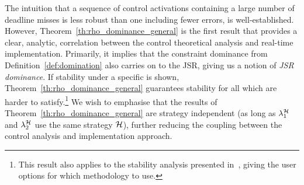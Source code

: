 The intuition that a sequence of control activations containing a large number of deadline misses is less robust than one including fewer errors, is well-established.
However, Theorem~\ref{th:rho_dominance_general} is the first result that provides a clear, analytic, correlation between the control theoretical analysis and real-time implementation.
Primarily, it implies that the constraint dominance from Definition~\ref{def:domination} also carries on to the JSR, giving us a notion of \emph{JSR dominance}.
If stability under a specific \ewhc{} is shown, Theorem~\ref{th:rho_dominance_general} guarantees stability for all \ewhc{} which are harder to satisfy.\footnote{This result also applies to the stability analysis presented in~\cite{Maggio:2020}, giving the user options for which methodology to use.}
We wish to emphasise that the results of Theorem~\ref{th:rho_dominance_general} are strategy independent (as long as $\lambda^{\mathcal{H}}_1$ and $\lambda^{\mathcal{H}}_2$ use the same strategy $\mathcal{H}$), further reducing the coupling between the control analysis and implementation approach.

